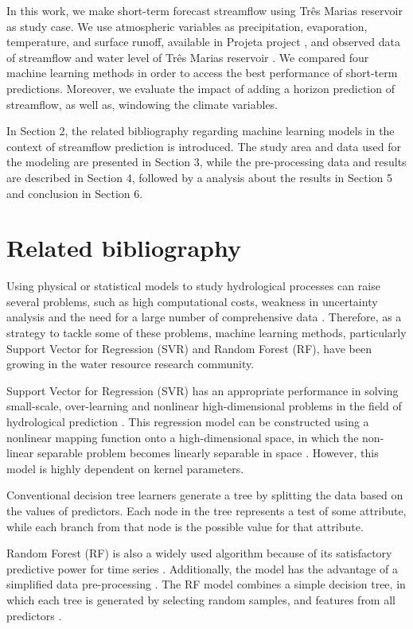 \documentclass[12pt]{article}
\begin{document}
In this work, we make short-term forecast streamflow using Três Marias reservoir as study case. We use atmospheric variables as precipitation, evaporation, temperature, and surface runoff, available in Projeta project \cite{inpe}, and observed data of streamflow and water level of Três Marias reservoir \cite{onsnivel,onsvazao}. We compared four machine learning methods in order to access the best performance of short-term predictions. Moreover, we evaluate the impact of adding a horizon prediction of streamflow, as well as, windowing the climate variables.

In Section 2, the related bibliography regarding machine learning models in the context of streamflow prediction is introduced. The study area and data used for the modeling are presented in Section 3, while the pre-processing data and results are described in Section 4, followed by a analysis about the results in Section 5 and conclusion in Section 6.

\section{Related bibliography}

Using physical or statistical models to study hydrological processes can raise several problems, such as high computational costs, weakness in uncertainty analysis and the need for a large number of comprehensive data \cite{ardabili2019deep}. Therefore, as a strategy to tackle some of these problems, machine learning methods, particularly Support Vector for Regression (SVR) and Random Forest (RF), have been growing in the water resource research community.

Support Vector for Regression (SVR) has an appropriate performance in solving small-scale, over-learning and nonlinear high-dimensional problems in the field of hydrological prediction \cite{xu,wang}. This regression model can be constructed using a nonlinear mapping function onto a high-dimensional space, in which the non-linear separable problem becomes linearly separable in space \cite{maity}. However, this model is highly dependent on kernel parameters.

Conventional decision tree learners generate a tree by splitting the data based on the values of predictors. Each node in the tree represents a test of some attribute, while each branch from that node is the possible value for that attribute.

Random Forest (RF) is also a widely used algorithm because of its satisfactory predictive power for time series \cite{wang}. Additionally, the model has the advantage of a simplified data pre-processing \cite{li}. The RF model combines a simple decision tree, in which each tree is generated by selecting random samples, and features from all predictors \cite{naghibi}.
\end{document}
